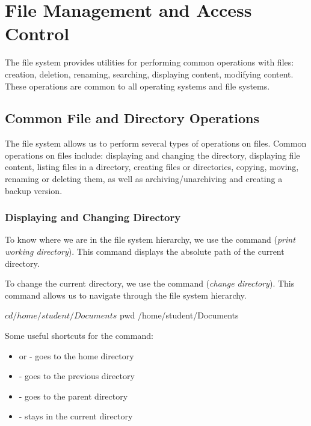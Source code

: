 \chapter{File Management and Access Control}
\label{ch:file-mgmt}

The file system provides utilities for performing common operations with files: creation, deletion, renaming, searching, displaying content, modifying content.
These operations are common to all operating systems and file systems.

\section{Common File and Directory Operations}
\label{sec:file-mgmt:file-ops}

The file system allows us to perform several types of operations on files.
Common operations on files include: displaying and changing the directory, displaying file content, listing files in a directory, creating files or directories, copying, moving, renaming or deleting them, as well as archiving/unarchiving and creating a backup version.

\subsection{Displaying and Changing Directory}
\label{sec:file-mgmt:dir-ops}

To know where we are in the file system hierarchy, we use the  command (\textit{print working directory}).
This command displays the absolute path of the current directory.


To change the current directory, we use the  command (\textit{change directory}).
This command allows us to navigate through the file system hierarchy.

\begin{screen}[style=bashstyle]
$ cd /home/student/Documents
$ pwd
/home/student/Documents
\end{screen}

Some useful shortcuts for the  command:
\begin{itemize}
  \item {} or  - goes to the home directory
  \item {} - goes to the previous directory
  \item {} - goes to the parent directory
  \item {} - stays in the current directory
\end{itemize}

